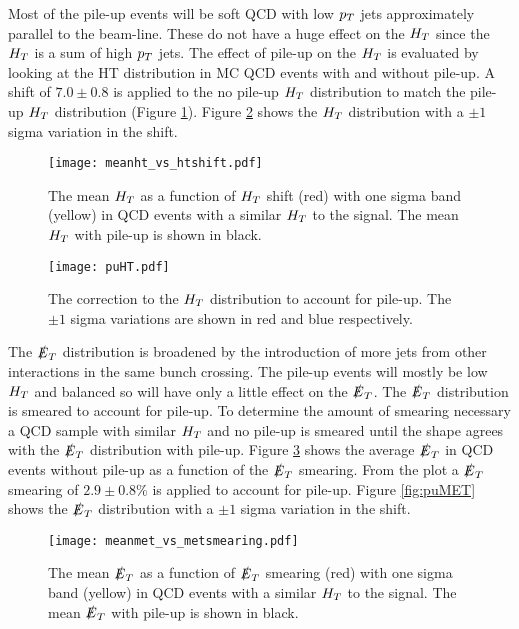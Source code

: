 Most of the pile-up events will be soft QCD with low $p_{T}$ jets approximately 
parallel to the beam-line. These do not have a huge effect on the $H_{T}$ since 
the $H_{T}$ is a sum of high $p_{T}$ jets. The effect of pile-up on the $H_{T}$ is 
evaluated by looking at the HT distribution in MC QCD events with and without 
pile-up. A shift of $7.0\pm0.8$ is applied to the no pile-up $H_{T}$ distribution 
to match the pile-up $H_{T}$ distribution (Figure \ref{fig:meanht_vs_htshift}). 
Figure \ref{fig:puHT} shows the $H_{T}$ distribution with a $\pm 1$ sigma 
variation in the shift. \\

\begin{figure}
\begin{center}
\texttt{[image: meanht\_vs\_htshift.pdf]}
\end{center}
\caption{The mean $H_{T}$ as a function of $H_{T}$ shift (red) with one sigma band 
(yellow) in QCD events with a similar $H_{T}$ to the signal. The mean $H_{T}$ with 
pile-up is shown in black.}
\label{fig:meanht_vs_htshift}
\end{figure}

\begin{figure}
\begin{center}
\texttt{[image: puHT.pdf]}
\end{center}
\caption{The correction to the $H_{T}$ distribution to account for pile-up. The
$\pm 1$ sigma variations are shown in red and blue respectively.}
\label{fig:puHT}
\end{figure}

The $\slashed{E}_{T}$ distribution is broadened by the introduction of more jets from other
interactions in the same bunch crossing. The pile-up events will mostly be low
$H_{T}$ and balanced so will have only a little effect on the $\slashed{E}_{T}$. The $\slashed{E}_{T}$
distribution is smeared to account for pile-up. To determine the amount of
smearing necessary a QCD sample with similar $H_{T}$ and no pile-up is smeared
until the shape agrees with the $\slashed{E}_{T}$ distribution with pile-up. Figure 
\ref{fig:meanmet_vs_metsmearing} shows the average $\slashed{E}_{T}$ in QCD events without 
pile-up as a function of the $\slashed{E}_{T}$ smearing. From the plot a $\slashed{E}_{T}$ smearing of 
$2.9\pm0.8\unit{\%}$ is applied to account for pile-up. Figure \ref{fig:puMET} 
shows the $\slashed{E}_{T}$ distribution with a $\pm 1$ sigma variation in the shift. \\

\begin{figure}
\begin{center}
\texttt{[image: meanmet\_vs\_metsmearing.pdf]}
\end{center}
\caption{The mean $\slashed{E}_{T}$ as a function of $\slashed{E}_{T}$ smearing (red) with one sigma
band (yellow) in QCD events with a similar $H_{T}$ to the signal. The mean $\slashed{E}_{T}$ 
with pile-up is shown in black.}
\label{fig:meanmet_vs_metsmearing}
\end{figure}

